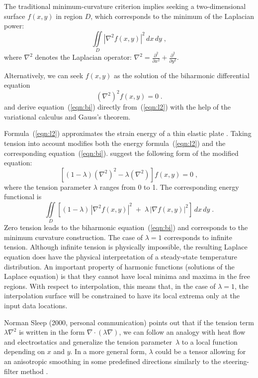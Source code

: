 The traditional minimum-curvature criterion implies seeking a
two-dimensional surface $f(x,y)$ in region $D$, which corresponds to
the minimum of the Laplacian power:
\begin{equation}
  \label{eqn:l2}
  \iint\limits_{D} \left|\nabla^2 f(x,y)\right|^2\,dx\,dy\;,
\end{equation}
where $\nabla^2$ denotes the Laplacian operator: $ \nabla^2 =
\frac{\partial^2}{\partial x^2} + \frac{\partial^2}{\partial y^2}$.
\par
Alternatively, we can seek $f(x,y)$ as the solution of the biharmonic
differential equation
\begin{equation}
  \label{eqn:bi}
  (\nabla^2)^2 f(x,y) = 0\;.
\end{equation}
\cite{fung} and \cite{GEO39-01-00390048} derive
equation~(\ref{eqn:bi}) directly from~(\ref{eqn:l2}) with the help of
the variational calculus and Gauss's theorem.
\par
Formula~(\ref{eqn:l2}) approximates the strain energy of a thin
elastic plate \cite[]{timoshenko}. Taking tension into account modifies
both the energy formula~(\ref{eqn:l2}) and the corresponding
equation~(\ref{eqn:bi}). \cite{GEO55-03-02930305} suggest the
following form of the modified equation:
\begin{equation}
  \label{eqn:bit}
  \left[(1-\lambda) (\nabla^2)^2 - \lambda (\nabla^2)\right] f(x,y) = 0\;,
\end{equation}
where the tension parameter $\lambda$ ranges from 0 to 1. The
corresponding energy functional is
\begin{equation}
  \label{eqn:l2lam}
  \iint\limits_{D} \left[(1-\lambda)\,\left|\nabla^2 f(x,y)\right|^2
\;+\;
\lambda\,\left|\nabla f(x,y)\right|^2\right]\,dx\,dy\;.
\end{equation}
Zero tension leads to the biharmonic equation~(\ref{eqn:bi}) and
corresponds to the minimum curvature construction. The case of
$\lambda=1$ corresponds to infinite tension. Although infinite tension
is physically impossible, the resulting Laplace equation does have the
physical interpretation of a steady-state temperature distribution. An
important property of harmonic functions (solutions of the Laplace
equation) is that they cannot have local minima and maxima in the free
regions. With respect to interpolation, this means that, in the case
of $\lambda=1$, the interpolation surface will be constrained to have
its local extrema only at the input data locations.

Norman Sleep (2000, personal communication) points out that if the
tension term $\lambda \nabla^2$ is written in the form $\nabla \cdot
(\lambda \nabla)$, we can follow an analogy with heat flow and
electrostatics and generalize the tension parameter~$\lambda$ to a
local function depending on $x$ and $y$. In a more general form,
$\lambda$ could be a tensor allowing for an anisotropic smoothing in
some predefined directions similarly to the steering-filter method
\cite[]{SEG-1998-1851}.

